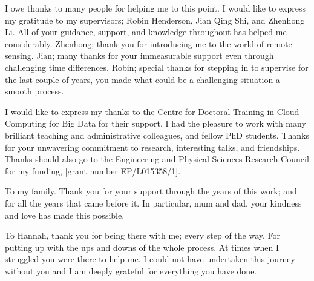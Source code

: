 
\begin{acknowledgements}      


I owe thanks to many people for helping me to this point. I would like to express my gratitude to my supervisors; Robin Henderson, Jian Qing Shi, and Zhenhong Li.
All of your guidance, support, and knowledge throughout  has helped me considerably. Zhenhong; thank you for introducing me to the world of remote sensing. Jian; many thanks for your immeasurable support even through challenging time differences. Robin; special thanks for stepping in to supervise for the last couple of years, you made what could be a challenging situation a smooth process.

I would like to express my thanks to the Centre for Doctoral Training in Cloud Computing for Big Data for their support. I had the pleasure to work with many brilliant teaching and administrative colleagues, and fellow PhD students. Thanks for your unwavering commitment to research, interesting talks, and friendships.
Thanks should also go to the Engineering and Physical Sciences Research Council for my funding, [grant number EP/L015358/1].

To my family. Thank you for your support through the years of this work; and for all the years that came before it.
In particular, mum and dad, your kindness and love has made this possible.

To Hannah, thank you for being there with me; every step of the way. For putting up with the ups and downs of the whole process. At times when I struggled you were there to help me. I could not have undertaken this journey without you and I am deeply grateful for everything you have done.
\end{acknowledgements}
